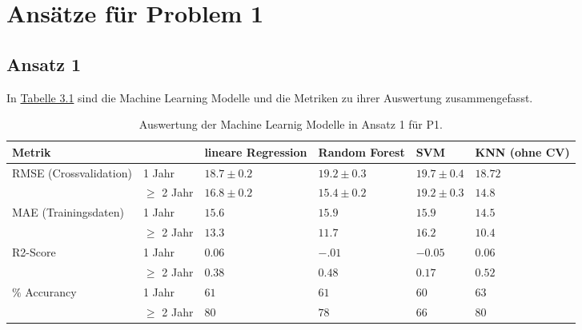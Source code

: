 \section{Ans\"atze f\"ur Problem 1}


\subsection{Ansatz 1}
In \hyperref[tab:ergebnisA1P1]{Tabelle 3.1} sind die Machine Learning Modelle und die Metriken zu ihrer Auswertung zusammengefasst.

\begin{table}[ht]
  \caption{\label{tab:ergebnisA1P1} Auswertung der Machine Learnig Modelle in Ansatz 1 f\"ur P1.}
  \begin{tabular}{ p{3cm} p{2cm} p{2cm} p{2cm} p{2cm} p{1.5cm} }
    \toprule
    Metrik &               & lineare Regression & Random Forest  & SVM            & KNN (ohne CV) \\
    \midrule
    \multirow{2}{3em}{RMSE (Crossvalidation)}
           & 1 Jahr        & $18.7 \pm 0.2$     & $19.2 \pm 0.3$ & $19.7 \pm 0.4$ & $18.72$       \\
           & $\geq$ 2 Jahr & $16.8 \pm 0.2$     & $15.4 \pm 0.2$ & $19.2 \pm 0.3$ & $14.8$        \\

    \midrule
    \multirow{2}{3em}{MAE (Trainingsdaten)}
           & 1 Jahr        & $15.6$             & $15.9$         & $15.9$         & $14.5$        \\
           & $\geq$ 2 Jahr & $13.3$             & $11.7$         & $16.2$         & $10.4$        \\

    \midrule
    \multirow{2}{3em}{R2-Score}
           & 1 Jahr        & $0.06$             & $-.01$         & $-0.05$        & $0.06$        \\
           & $\geq$ 2 Jahr & $0.38$             & $0.48$         & $0.17$         & $0.52$        \\

    \midrule
    \multirow{2}{3em}{$\%$ Accurancy}
           & 1 Jahr        & $61$               & $61$           & $60$           & $63$          \\
           & $\geq$ 2 Jahr & $80$               & $78$           & $66$           & $80$          \\

    \bottomrule
  \end{tabular}

\end{table}

